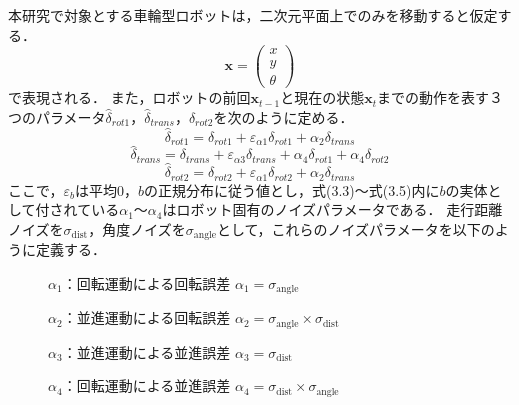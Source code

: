 本研究で対象とする車輪型ロボットは，二次元平面上でのみを移動すると仮定する．
\begin{equation}
    \mathbf{x} 
    =
    \begin{pmatrix}
        x \\ y \\ \theta
    \end{pmatrix}
\end{equation}
で表現される．
また，ロボットの前回$\displaystyle \mathbf{x}$$\displaystyle _{t-1}$と現在の状態$\displaystyle \mathbf{x}$$\displaystyle _{t}$までの動作を表す３つのパラメータ$\displaystyle \hat{\delta }_{rot1}$，$\displaystyle \hat{\delta }_{trans}$，$\displaystyle \hat{\delta }_{rot2}$を次のように定める．
\begin{equation}
\displaystyle \hat{\delta }_{rot1} =\delta _{rot1} +\varepsilon _{\alpha 1} \delta _{rot1} +\alpha _{2} \delta _{trans}
\end{equation}
\begin{equation}
\displaystyle \hat{\delta }_{trans} =\delta _{trans} +\varepsilon _{\alpha 3} \delta _{trans} +\alpha _{4} \delta _{rot1} +\alpha _{4} \delta _{rot2}  
\end{equation}
\begin{equation}
\displaystyle \hat{\delta }_{rot2} =\delta _{rot2} +\varepsilon _{\alpha 1} \delta _{rot2} +\alpha _{2} \delta _{trans}
\end{equation}
ここで，$\displaystyle \varepsilon _{b}$は平均0，$\displaystyle b$の正規分布に従う値とし，式(3.3)～式(3.5)内に$\displaystyle b$の実体として付されている$\displaystyle \alpha _{1}～\displaystyle \alpha _{4}$はロボット固有のノイズパラメータである．
走行距離ノイズを$\sigma_\text{dist}$，角度ノイズを$\sigma_\text{angle}$として，これらのノイズパラメータを以下のように定義する．
\begin{description}
    \item[\hspace{2em}]  $\alpha_1$：回転運動による回転誤差 $\alpha_1=\sigma_\text{angle}$
    \item[\hspace{2em}]  $\alpha_2$：並進運動による回転誤差 $\alpha_2=\sigma_\text{angle} \times \sigma_\text{dist}$
    \item[\hspace{2em}]  $\alpha_3$：並進運動による並進誤差 $\alpha_3=\sigma_\text{dist}$
    \item[\hspace{2em}]  $\alpha_4$：回転運動による並進誤差 $\alpha_4=\sigma_\text{dist} \times \sigma_\text{angle}$
\end{description}
